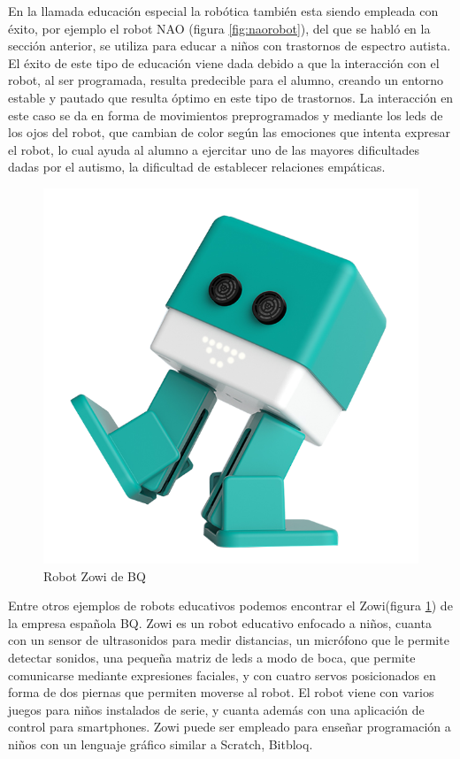 En la llamada educación especial la robótica también esta siendo empleada con éxito, por ejemplo el robot NAO (figura \ref{fig:naorobot}), del que se habló en la sección anterior, se utiliza para educar a niños con trastornos de espectro autista. El éxito de este tipo de educación viene dada debido a que la interacción con el robot, al ser programada, resulta predecible para el alumno, creando un entorno estable y pautado que resulta óptimo en este tipo de trastornos. La interacción en este caso se da en forma de movimientos preprogramados y mediante los leds de los ojos del robot, que cambian de color según las emociones que intenta expresar el robot, lo cual ayuda al alumno a ejercitar uno de las mayores dificultades dadas por el autismo, la dificultad de establecer relaciones empáticas.
 

 
   \begin{figure}
	\centering
	\includegraphics[width=0.6\linewidth]{imagenes/zowi.png}
	\caption{Robot Zowi de BQ}
	\label{fig:zowi}
\end{figure} 

 Entre otros ejemplos de robots educativos podemos encontrar el Zowi(figura \ref{fig:zowi}) de la empresa española BQ. Zowi es un robot educativo enfocado a niños, cuanta con un sensor de ultrasonidos para medir distancias, un micrófono que le permite detectar sonidos, una pequeña matriz de leds a modo de boca, que permite comunicarse mediante expresiones faciales, y con cuatro servos posicionados en forma de dos piernas que permiten moverse al robot.
 El robot viene con varios juegos para niños instalados de serie, y cuanta además con una aplicación de control para smartphones. Zowi puede ser empleado para enseñar programación a niños con un lenguaje gráfico similar a Scratch\cite{scratch}, Bitbloq\cite{bitbloq}.
 
